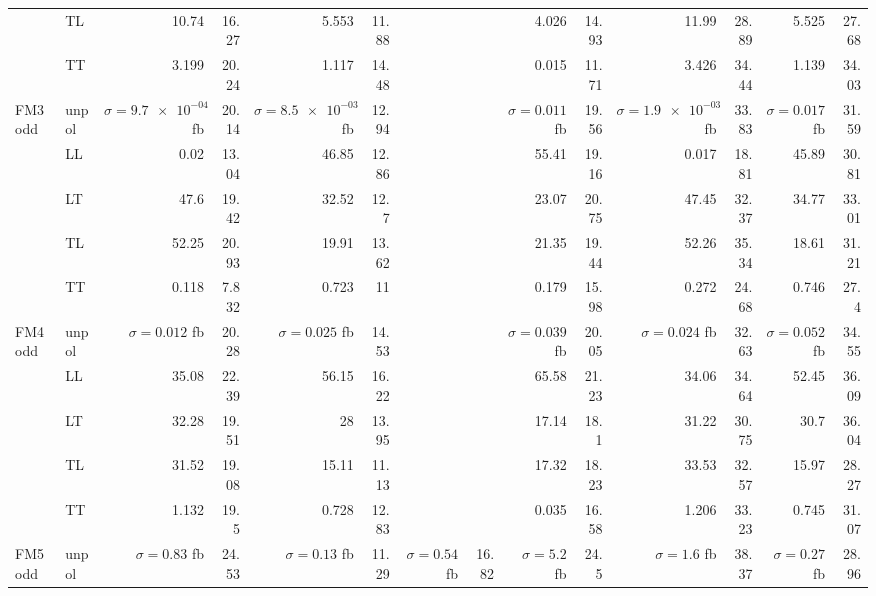 \begin{table}[H]
{\begin{tabular}{llrrrrrrrrrrrr}
 & TL & \num{10.74} & \num{16.27} & \num{5.553} & \num{11.88} &  &  & \num{4.026} & \num{14.93} & \num{11.99} & \num{28.89} & \num{5.525} & \num{27.68} \\
 & TT & \num{3.199} & \num{20.24} & \num{1.117} & \num{14.48} &  &  & \num{0.015} & \num{11.71} & \num{3.426} & \num{34.44} & \num{1.139} & \num{34.03} \\
\midrule
\multirow{5}{*}{FM3odd}
 & unpol & $\sigma = \num{9.7e-04}$ fb & \num{20.14} & $\sigma = \num{8.5e-03}$ fb & \num{12.94} &  &  & $\sigma = \num{0.011}$ fb & \num{19.56} & $\sigma = \num{1.9e-03}$ fb & \num{33.83} & $\sigma = \num{0.017}$ fb & \num{31.59} \\
 & LL & \num{0.02} & \num{13.04} & \num{46.85} & \num{12.86} &  &  & \num{55.41} & \num{19.16} & \num{0.017} & \num{18.81} & \num{45.89} & \num{30.81} \\
 & LT & \num{47.6} & \num{19.42} & \num{32.52} & \num{12.7} &  &  & \num{23.07} & \num{20.75} & \num{47.45} & \num{32.37} & \num{34.77} & \num{33.01} \\
 & TL & \num{52.25} & \num{20.93} & \num{19.91} & \num{13.62} &  &  & \num{21.35} & \num{19.44} & \num{52.26} & \num{35.34} & \num{18.61} & \num{31.21} \\
 & TT & \num{0.118} & \num{7.832} & \num{0.723} & \num{11} &  &  & \num{0.179} & \num{15.98} & \num{0.272} & \num{24.68} & \num{0.746} & \num{27.4} \\
\midrule
\multirow{5}{*}{FM4odd}
 & unpol & $\sigma = \num{0.012}$ fb & \num{20.28} & $\sigma = \num{0.025}$ fb & \num{14.53} &  &  & $\sigma = \num{0.039}$ fb & \num{20.05} & $\sigma = \num{0.024}$ fb & \num{32.63} & $\sigma = \num{0.052}$ fb & \num{34.55} \\
 & LL & \num{35.08} & \num{22.39} & \num{56.15} & \num{16.22} &  &  & \num{65.58} & \num{21.23} & \num{34.06} & \num{34.64} & \num{52.45} & \num{36.09} \\
 & LT & \num{32.28} & \num{19.51} & \num{28} & \num{13.95} &  &  & \num{17.14} & \num{18.1} & \num{31.22} & \num{30.75} & \num{30.7} & \num{36.04} \\
 & TL & \num{31.52} & \num{19.08} & \num{15.11} & \num{11.13} &  &  & \num{17.32} & \num{18.23} & \num{33.53} & \num{32.57} & \num{15.97} & \num{28.27} \\
 & TT & \num{1.132} & \num{19.5} & \num{0.728} & \num{12.83} &  &  & \num{0.035} & \num{16.58} & \num{1.206} & \num{33.23} & \num{0.745} & \num{31.07} \\
\midrule
\multirow{5}{*}{FM5odd}
 & unpol & $\sigma = \num{0.83}$ fb & \num{24.53} & $\sigma = \num{0.13}$ fb & \num{11.29} & $\sigma = \num{0.54}$ fb & \num{16.82} & $\sigma = \num{5.2}$ fb & \num{24.5} & $\sigma = \num{1.6}$ fb & \num{38.37} & $\sigma = \num{0.27}$ fb & \num{28.96} \\

\end{tabular}}
\end{table}
